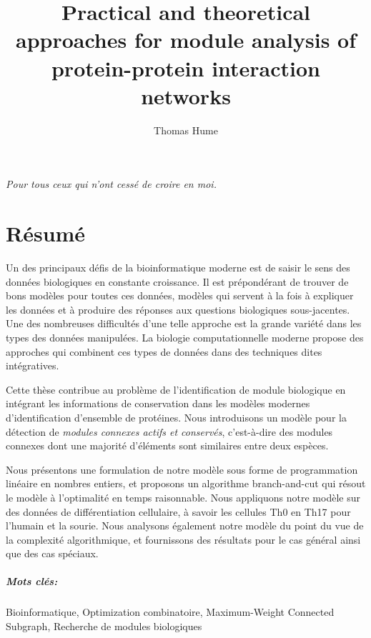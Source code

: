 \documentclass[11pt,a4paper,twoside]{memoir}
\title{Practical and theoretical approaches for module analysis of protein-protein interaction networks}
\author{Thomas Hume}
\begin{document}

\thispagestyle{empty}
\clearpage

\frontmatter

\vphantom{foobar} \vphantom{foobar} \vphantom{foobar} \vphantom{foobar} \vphantom{foobar} \vphantom{foobar} \vphantom{foobar} \vphantom{foobar}
\hspace{\fill}\emph{Pour tous ceux qui n'ont cessé de croire en moi.}
\thispagestyle{empty}


\chapter*{Résumé}

Un des principaux défis de la bioinformatique moderne est de saisir le sens des données biologiques en constante croissance.
Il est prépondérant de trouver de bons modèles pour toutes ces données, modèles qui servent à la fois à expliquer les données et à produire des réponses aux questions biologiques sous-jacentes.
Une des nombreuses difficultés d'une telle approche est la grande variété dans les types des données manipulées.
La biologie computationnelle moderne propose des approches qui combinent ces types de données dans des techniques dites intégratives.

Cette thèse contribue au problème de l'identification de module biologique en intégrant les informations de conservation dans les modèles modernes d’identification d'ensemble de protéines.
Nous introduisons un modèle pour la détection de \emph{modules connexes actifs et conservés}, c'est-à-dire des modules connexes dont une majorité d'éléments sont similaires entre deux espèces.

Nous présentons une formulation de notre modèle sous forme de programmation linéaire en nombres entiers, et proposons un algorithme branch-and-cut qui résout le modèle à l'optimalité en temps raisonnable.
Nous appliquons notre modèle sur des données de différentiation cellulaire, à savoir les cellules Th0 en Th17 pour l'humain et la sourie.
Nous analysons également notre modèle du point du vue de la complexité algorithmique, et fournissons des résultats pour le cas général ainsi que des cas spéciaux.

\paragraph{Mots clés:}Bioinformatique, Optimization combinatoire, Maximum-Weight Connected Subgraph, Recherche de modules biologiques
\end{document}
